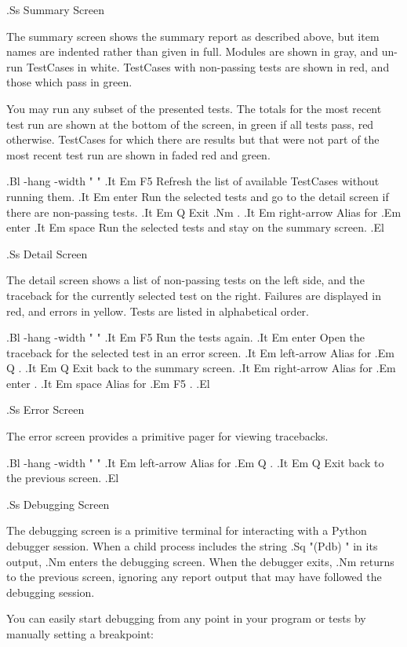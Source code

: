 .Ss Summary Screen

The summary screen shows the summary report as described above, but item names
are indented rather than given in full. Modules are shown in gray, and un-run
TestCases in white. TestCases with non-passing tests are shown in red, and those
which pass in green.

You may run any subset of the presented tests. The totals for the most recent
test run are shown at the bottom of the screen, in green if all tests pass, red
otherwise. TestCases for which there are results but that were not part of the
most recent test run are shown in faded red and green.

.Bl -hang -width "      "
.It Em F5
Refresh the list of available TestCases without running them.
.It Em enter
Run the selected tests and go to the detail screen if there are non-passing
tests.
.It Em Q
Exit
.Nm .
.It Em right-arrow
Alias for
.Em enter
.It Em space
Run the selected tests and stay on the summary screen.
.El


.Ss Detail Screen

The detail screen shows a list of non-passing tests on the left side, and the
traceback for the currently selected test on the right. Failures are displayed
in red, and errors in yellow. Tests are listed in alphabetical order.

.Bl -hang -width "      "
.It Em F5
Run the tests again.
.It Em enter
Open the traceback for the selected test in an error screen.
.It Em left-arrow
Alias for
.Em Q .
.It Em Q
Exit back to the summary screen.
.It Em right-arrow
Alias for
.Em enter .
.It Em space
Alias for
.Em F5 .
.El


.Ss Error Screen

The error screen provides a primitive pager for viewing tracebacks.

.Bl -hang -width "      "
.It Em left-arrow
Alias for
.Em Q .
.It Em Q
Exit back to the previous screen.
.El


.Ss Debugging Screen

The debugging screen is a primitive terminal for interacting with a Python
debugger session. When a child process includes the string
.Sq "(Pdb) "
in its output,
.Nm
enters the debugging screen. When the debugger exits,
.Nm
returns to the previous screen, ignoring any report output that may have
followed the debugging session.

You can easily start debugging from any point in your program or tests by
manually setting a breakpoint:

